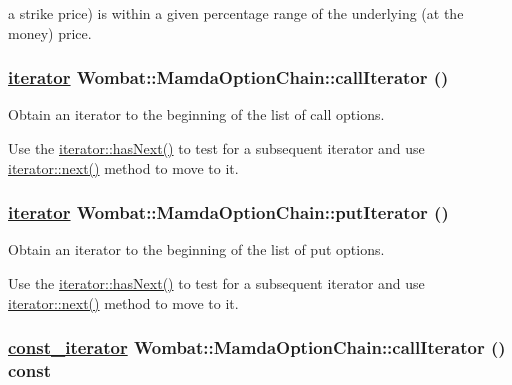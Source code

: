 a strike price) is within a given percentage range of the underlying (at the money) price. \hypertarget{classWombat_1_1MamdaOptionChain_67f773d9967e44398ea03cd44f0fcc48}{
\subsubsection[callIterator]{\setlength{\rightskip}{0pt plus 5cm}\hyperlink{classWombat_1_1MamdaOptionChain_1_1iterator}{iterator} Wombat::Mamda\-Option\-Chain::call\-Iterator ()}}
\label{classWombat_1_1MamdaOptionChain_67f773d9967e44398ea03cd44f0fcc48}


Obtain an iterator to the beginning of the list of call options. 

Use the \hyperlink{classWombat_1_1MamdaOptionChain_1_1iterator_2b7d07e58b4f3b0134d57483388f106c}{iterator::has\-Next()} to test for a subsequent iterator and use \hyperlink{classWombat_1_1MamdaOptionChain_1_1iterator_ca4efaeb0cd56b2ec22bcc8288e78a81}{iterator::next()} method to move to it. \hypertarget{classWombat_1_1MamdaOptionChain_9e94ee48221e0be5f47c33e9d5065345}{
\subsubsection[putIterator]{\setlength{\rightskip}{0pt plus 5cm}\hyperlink{classWombat_1_1MamdaOptionChain_1_1iterator}{iterator} Wombat::Mamda\-Option\-Chain::put\-Iterator ()}}
\label{classWombat_1_1MamdaOptionChain_9e94ee48221e0be5f47c33e9d5065345}


Obtain an iterator to the beginning of the list of put options. 

Use the \hyperlink{classWombat_1_1MamdaOptionChain_1_1iterator_2b7d07e58b4f3b0134d57483388f106c}{iterator::has\-Next()} to test for a subsequent iterator and use \hyperlink{classWombat_1_1MamdaOptionChain_1_1iterator_ca4efaeb0cd56b2ec22bcc8288e78a81}{iterator::next()} method to move to it. \hypertarget{classWombat_1_1MamdaOptionChain_ad8f3535caee91bda7f8165da6ffc36d}{
\subsubsection[callIterator]{\setlength{\rightskip}{0pt plus 5cm}\hyperlink{classWombat_1_1MamdaOptionChain_1_1const__iterator}{const\_\-iterator} Wombat::Mamda\-Option\-Chain::call\-Iterator () const}}
\label{classWombat_1_1MamdaOptionChain_ad8f3535caee91bda7f8165da6ffc36d}


